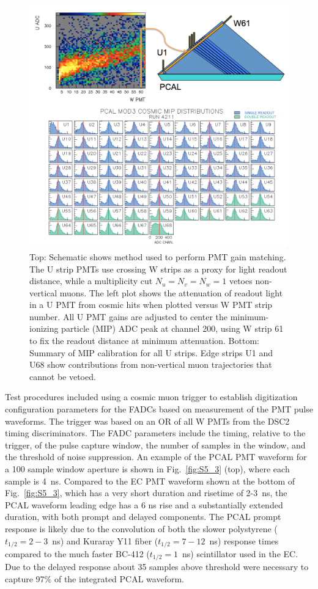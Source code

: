 \begin{figure}[hbt]
\centering
\includegraphics[width=0.95\columnwidth,keepaspectratio]{img/S5_4.png}
\caption{Top: Schematic shows method used to perform PMT gain matching. The U strip PMTs use crossing W
  strips as a proxy for light readout distance, while a multiplicity cut $N_u=N_v=N_w=1$ vetoes non-vertical muons.
  The left plot shows the attenuation of readout light in a U PMT from cosmic hits when plotted versus W PMT strip
  number. All U PMT gains are adjusted to center the minimum-ionizing particle (MIP) ADC peak at channel 200,
  using W strip 61 to fix the readout distance at minimum attenuation. Bottom: Summary of MIP calibration for all
  U strips. Edge strips U1 and U68 show contributions from non-vertical muon trajectories that cannot be vetoed.}
\label{fig:S5_4}
\end{figure}

Test procedures included using a cosmic muon trigger to establish digitization configuration parameters for the FADCs based on
measurement of the PMT pulse waveforms.  The trigger was based on an OR of all W PMTs from the DSC2 timing discriminators.
The FADC parameters include the timing, relative to the trigger, of the pulse capture window, the number of samples in the window, and the threshold of noise suppression.  An example of the PCAL PMT waveform for a 100 sample window aperture is shown in Fig.~\ref{fig:S5_3} (top), where each sample is 4~ns. Compared to the EC PMT waveform shown at the bottom of Fig.~\ref{fig:S5_3}, which has a very short duration and risetime of 2-3~ns, the PCAL waveform leading edge has a 6 ns rise and a substantially extended duration, with both prompt and delayed components. The PCAL prompt response is likely due to the convolution of both the slower polystyrene ($t_{1/2}=2-3$~ns) and Kuraray Y11 fiber ($t_{1/2}=7-12$~ns) response times compared
to the much faster BC-412 ($t_{1/2}=1$~ns) scintillator used in the EC. Due to the delayed response about 35
samples above threshold were necessary to capture 97$\%$ of the integrated PCAL waveform.  

